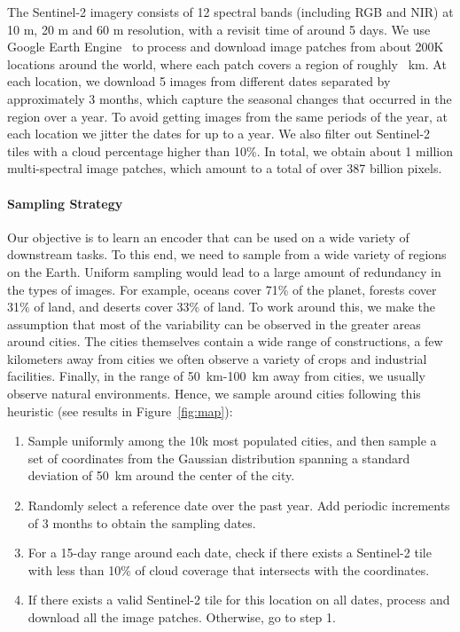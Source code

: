 \documentclass[10pt,twocolumn,letterpaper]{article}
\begin{document}
The Sentinel-2 imagery consists of 12 spectral bands (including RGB and NIR) at 10 m, 20 m and 60 m resolution, with a revisit time of around 5 days. We use Google Earth Engine~\cite{gorelick2017google} to process and download image patches from about 200K locations around the world, where each patch covers a region of roughly ~km. At each location, we download 5 images from different dates separated by approximately 3 months, which capture the seasonal changes that occurred in the region over a year. To avoid getting images from the same periods of the year, at each location we jitter the dates for up to a year. We also filter out Sentinel-2 tiles with a cloud percentage higher than 10\%. In total, we obtain about 1 million multi-spectral image patches, which amount to a total of over 387 billion pixels.

\vspace{-1em}\paragraph{Sampling Strategy} Our objective is to learn an encoder that can be used on a wide variety of downstream tasks. To this end, we need to sample from a wide variety of regions on the Earth. Uniform sampling would lead to a large amount of redundancy in the types of images. For example, oceans cover 71\% of the planet, forests cover 31\% of land, and deserts cover 33\% of land. To work around this, we make the assumption that most of the variability can be observed in the greater areas around cities. The cities themselves contain a wide range of constructions, a few kilometers away from cities we often observe a variety of crops and industrial facilities. Finally, in the range of 50~km-100~km away from cities, we usually observe natural environments. Hence, we sample around cities following this heuristic (see results in Figure~\ref{fig:map}):

\begin{enumerate}[nolistsep]
    \item Sample uniformly among the 10k most populated cities, and then sample a set of coordinates from the Gaussian distribution spanning a standard deviation of 50~km around the center of the city.
    \item Randomly select a reference date over the past year. Add periodic increments of 3 months to obtain the sampling dates.
    \item For a 15-day range around each date, check if there exists a Sentinel-2 tile with less than 10\% of cloud coverage that intersects with the coordinates.
    \item If there exists a valid Sentinel-2 tile for this location on all dates, process and download all the image patches. Otherwise, go to step 1.
\end{enumerate}
\end{document}
